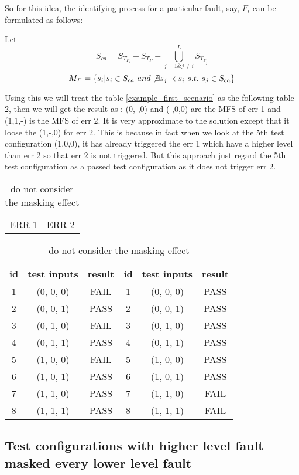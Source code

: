 \documentclass{sig-alternate}
\begin{document}
So for this idea, the identifying process for a particular fault, say, $F_{i}$ can be formulated as follows:

Let $$S_{ca} = S_{T_{F_{i}}} - S_{T_{P}} - \bigcup_{j = 1 \& j \neq i }^{L}S_{T_{F_{j}}}$$
$$M_{F} = \{s_{i} | s_{i} \in S_{ca}\ and \not\exists s_{j} \prec s_{i}\ s.t.\ s_{j} \in S_{ca} \}$$

Using this we will treat the table \ref{example_first_scenario} as the following table \ref{simple_idea}, then we will get the result as : (0,-,0) and (-,0,0) are the MFS of err 1 and (1,1,-) is the MFS of err 2. It is very approximate to the solution except that it loose the (1,-,0) for err 2. This is because in fact when we look at the 5th test configuration (1,0,0), it has already triggered the err 1 which have a higher level than err 2 so that err 2 is not triggered. But this approach just regard the 5th test configuration as a passed test configuration as it does not trigger err 2.

\begin{table}
\centering
\caption{do not consider the masking effect}
\label{simple_idea}
\begin{tabular}{p{}|p{}} \hline
   ERR 1 & ERR 2
\end{tabular}

\begin{tabular}{c|c|c|c|c|c} \hline
id &test inputs & result & id&test inputs & result\\ \hline
1 &(0, 0, 0) &  FAIL &1&(0, 0, 0) &  PASS\\ \hline
2 &(0, 0, 1) &  PASS &2&(0, 0, 1) &  PASS\\ \hline
3 &(0, 1, 0) &  FAIL &3&(0, 1, 0) &  PASS\\ \hline
4 &(0, 1, 1) &  PASS &4&(0, 1, 1) &  PASS\\ \hline
5 &(1, 0, 0) &  FAIL &5&(1, 0, 0) &  PASS\\ \hline
6 &(1, 0, 1) &  PASS &6&(1, 0, 1) &  PASS\\ \hline
7 &(1, 1, 0) &  PASS &7&(1, 1, 0) &  FAIL\\ \hline
8 &(1, 1, 1) &  PASS &8&(1, 1, 1) &  FAIL\\ \hline
\hline\end{tabular}
\end{table}


\subsection{Test configurations with higher level fault masked every lower level fault}
\end{document}

